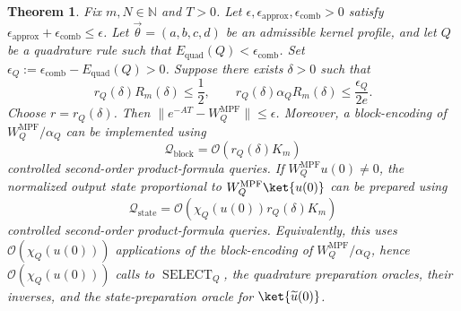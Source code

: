 \documentclass[10pt,reqno]{article}
\numberwithin{equation}{section}
\theoremstyle{plain}
\newtheorem{thm}{Theorem}[section]
\theoremstyle{definition}
\begin{document}
\begin{thm}
\label{abstract-fixed-order-arbitrary-quadrature}
Fix \(m,N\in\mathbb N\) and \(T>0\). 
Let \(\epsilon,\epsilon_{\operatorname{approx}},\epsilon_{\operatorname{comb}}>0\) satisfy \(\epsilon_{\operatorname{approx}}+\epsilon_{\operatorname{comb}}\leq\epsilon\). Let \(\vec{\theta}=(a,b,c,d)\) be an admissible kernel profile, and let \(Q\) be a quadrature rule such that \(E_{\operatorname{quad}}(Q)<\epsilon_{\operatorname{comb}}\). Set \(\epsilon_Q:=\epsilon_{\operatorname{comb}}-E_{\operatorname{quad}}(Q)>0\). Suppose there exists \(\delta>0\) such that
\begin{equation}\label{abstract-delta-admissible}
r_Q(\delta)R_m(\delta)\leq \frac12, \qquad r_Q(\delta)\alpha_QR_m(\delta) \leq \frac{\epsilon_Q}{2e}.
\end{equation}
Choose \(r=r_Q(\delta)\). Then \(\|e^{-AT}-W_Q^{\operatorname{MPF}}\|\leq\epsilon\). Moreover, a block-encoding of \(W_Q^{\operatorname{MPF}}/\alpha_Q\) can be implemented using
\begin{equation}\label{abstract-fixed-block-complexity}
\mathcal Q_{\operatorname{block}} = \mathcal O\left(r_Q(\delta)K_m\right)
\end{equation}
controlled second-order product-formula queries. If \(W_Q^{\operatorname{MPF}}u(0)\neq0\), the normalized output state proportional
to \(W_Q^{\operatorname{MPF}}\ket{u(0)}\) can be prepared using
\begin{equation}\label{abstract-fixed-state-complexity}
\mathcal Q_{\operatorname{state}} = \mathcal O\left(\chi_Q(u(0))r_Q(\delta)K_m\right)
\end{equation}
controlled second-order product-formula queries. Equivalently, this uses \(\mathcal O(\chi_Q(u(0)))\) applications of the block-encoding of \(W_Q^{\operatorname{MPF}}/\alpha_Q\), hence \(\mathcal O(\chi_Q(u(0)))\) calls to \(\operatorname{SELECT}_Q\), the quadrature preparation oracles, their inverses, and the state-preparation oracle for \(\ket{\widetilde u(0)}\).
\end{thm}
\end{document}

